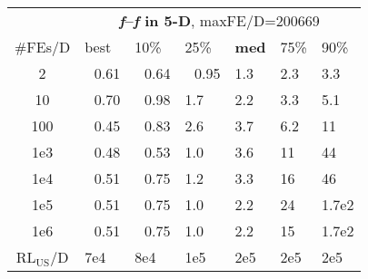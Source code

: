 \begin{tabular}{c|llllll}
 & \multicolumn{6}{|c}{\textbf{\textit{f}\raisebox{-0.35ex}{1}--\textit{f}\raisebox{-0.35ex}{24} in 5-D}, maxFE/D=200669}\\
\#FEs/D & best & 10\% & 25\% & \textbf{med} & 75\% & 90\%\\
2 & ~\,0.61 & ~\,0.64 & ~\,0.95 & \hspace*{1ex}1.3 & \hspace*{1ex}2.3 & \hspace*{1ex}3.3\\
10 & ~\,0.70 & ~\,0.98 & \hspace*{1ex}1.7 & \hspace*{1ex}2.2 & \hspace*{1ex}3.3 & \hspace*{1ex}5.1\\
100 & ~\,0.45 & ~\,0.83 & \hspace*{1ex}2.6 & \hspace*{1ex}3.7 & \hspace*{1ex}6.2 & 11\\
1e3 & ~\,0.48 & ~\,0.53 & \hspace*{1ex}1.0 & \hspace*{1ex}3.6 & 11 & 44\\
1e4 & ~\,0.51 & ~\,0.75 & \hspace*{1ex}1.2 & \hspace*{1ex}3.3 & 16 & 46\\
1e5 & ~\,0.51 & ~\,0.75 & \hspace*{1ex}1.0 & \hspace*{1ex}2.2 & 24 & 1.7e2\\
1e6 & ~\,0.51 & ~\,0.75 & \hspace*{1ex}1.0 & \hspace*{1ex}2.2 & 15 & 1.7e2\\
$\text{RL}_{\text{US}}$/D & 7e4 & 8e4 & 1e5 & 2e5 & 2e5 & 2e5
\end{tabular}
